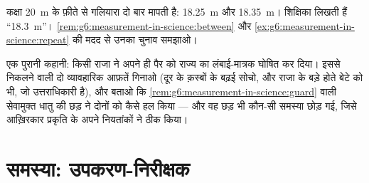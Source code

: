 \begin{exercise}[$\star\star$]\label{exo:g6:measurement-in-science:11}
कक्षा \qty{20}{m} के फ़ीते से गलियारा दो बार मापती है:
\qty{18.25}{m} और \qty{18.35}{m}। शिक्षिका लिखती हैं
``\qty{18.3}{m}''। \cref{rem:g6:measurement-in-science:between} और
\cref{ex:g6:measurement-in-science:repeat} की मदद से उनका चुनाव
समझाओ।
\end{exercise}

\begin{exercise}[$\star\star\star$]\label{exo:g6:measurement-in-science:12}
एक पुरानी कहानी: किसी राजा ने अपने ही पैर को राज्य का लंबाई-मात्रक
घोषित कर दिया। इससे निकलने वाली दो व्यावहारिक आफ़तें गिनाओ (दूर के
क़स्बों के बढ़ई सोचो, और राजा के बड़े होते बेटे को भी, जो उत्तराधिकारी
है), और बताओ कि \cref{rem:g6:measurement-in-science:guard} वाली
सेवामुक्त धातु की छड़ ने दोनों को कैसे हल किया --- और वह छड़ भी
कौन-सी समस्या छोड़ गई, जिसे आख़िरकार प्रकृति के अपने नियतांकों ने ठीक
किया।
\end{exercise}

\section{समस्या: उपकरण-निरीक्षक}

